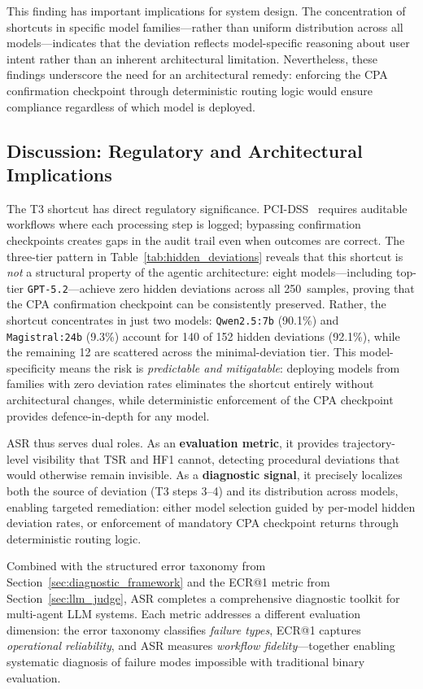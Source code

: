This finding has important implications for system design. The concentration of shortcuts in specific model families---rather than uniform distribution across all models---indicates that the deviation reflects model-specific reasoning about user intent rather than an inherent architectural limitation. Nevertheless, these findings underscore the need for an architectural remedy: enforcing the CPA confirmation checkpoint through deterministic routing logic would ensure compliance regardless of which model is deployed.

\subsection{Discussion: Regulatory and Architectural Implications}

The T3 shortcut has direct regulatory significance. PCI-DSS~\cite{pcisecurity2025ai} requires auditable workflows where each processing step is logged; bypassing confirmation checkpoints creates gaps in the audit trail even when outcomes are correct. The three-tier pattern in Table~\ref{tab:hidden_deviations} reveals that this shortcut is \textit{not} a structural property of the agentic architecture: eight models---including top-tier \texttt{GPT-5.2}---achieve zero hidden deviations across all 250~samples, proving that the CPA confirmation checkpoint can be consistently preserved. Rather, the shortcut concentrates in just two models: \texttt{Qwen2.5:7b} (90.1\%) and \texttt{Magistral:24b} (9.3\%) account for 140 of 152 hidden deviations (92.1\%), while the remaining 12 are scattered across the minimal-deviation tier. This model-specificity means the risk is \textit{predictable and mitigatable}: deploying models from families with zero deviation rates eliminates the shortcut entirely without architectural changes, while deterministic enforcement of the CPA checkpoint provides defence-in-depth for any model.

ASR thus serves dual roles. As an \textbf{evaluation metric}, it provides trajectory-level visibility that TSR and HF1 cannot, detecting procedural deviations that would otherwise remain invisible. As a \textbf{diagnostic signal}, it precisely localizes both the source of deviation (T3 steps 3--4) and its distribution across models, enabling targeted remediation: either model selection guided by per-model hidden deviation rates, or enforcement of mandatory CPA checkpoint returns through deterministic routing logic.

Combined with the structured error taxonomy from Section~\ref{sec:diagnostic_framework} and the ECR@1 metric from Section~\ref{sec:llm_judge}, ASR completes a comprehensive diagnostic toolkit for multi-agent LLM systems. Each metric addresses a different evaluation dimension: the error taxonomy classifies \textit{failure types}, ECR@1 captures \textit{operational reliability}, and ASR measures \textit{workflow fidelity}---together enabling systematic diagnosis of failure modes impossible with traditional binary evaluation.

